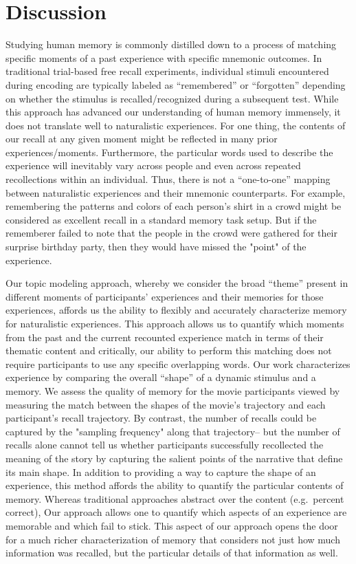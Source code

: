 \documentclass{article}
\begin{document}
\section*{Discussion}
\label{sec:discussion}
Studying human memory is commonly distilled down to a process of matching specific moments of a past experience with specific mnemonic outcomes.  In traditional trial-based free recall experiments, individual stimuli encountered during encoding are typically labeled as ``remembered'' or ``forgotten'' depending on whether the stimulus is recalled/recognized during a subsequent test. While this approach has advanced our understanding of human memory immensely, it does not translate well to naturalistic experiences. For one thing, the contents of our recall at any given moment might be reflected in many prior experiences/moments. Furthermore, the particular words used to describe the experience will inevitably vary across people and even across repeated recollections within an individual. Thus, there is not a ``one-to-one'' mapping between naturalistic experiences and their mnemonic counterparts. For example, remembering the patterns and colors of each person's shirt in a crowd might be considered as excellent recall in a standard memory task setup. But if the rememberer failed to note that the people in the crowd were gathered for their surprise birthday party, then they would have missed the "point" of the experience.

Our topic modeling approach, whereby we consider the broad ``theme'' present in different moments of participants' experiences and their memories for those experiences, affords us the ability to flexibly and accurately characterize memory for naturalistic experiences. This approach allows us to quantify which moments from the past and the current recounted experience match in terms of their thematic content and critically, our ability to perform this matching does not require participants to use any specific overlapping words. Our work characterizes experience by comparing the overall ``shape'' of a dynamic stimulus and a memory. We assess the quality of memory for the movie participants viewed by measuring the match between the shapes of the movie's trajectory and each participant's recall trajectory. By contrast, the number of recalls could be captured by the "sampling frequency" along that trajectory-- but the number of recalls alone cannot tell us whether participants successfully recollected the meaning of the story by capturing the salient points of the narrative that define its main shape. In addition to providing a way to capture the shape of an experience, this method affords the ability to quantify the particular contents of memory.  Whereas traditional approaches abstract over the content (e.g.\ percent correct), Our approach allows one to quantify which aspects of an experience are memorable and which fail to stick. This aspect of our approach opens the door for a much richer characterization of memory that considers not just how much information was recalled, but the particular details of that information as well.
\end{document}

